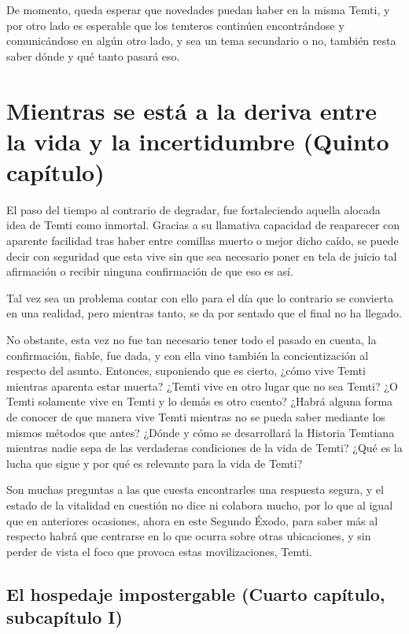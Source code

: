 \documentclass[
  spanish,
]{book}
\begin{document}
De momento, queda esperar que novedades puedan haber en la misma Temti, y por otro lado es esperable que los temteros continúen encontrándose y comunicándose en algún otro lado, y sea un tema secundario o no, también resta saber dónde y qué tanto pasará eso.

\hypertarget{mientras-se-estuxe1-a-la-deriva-entre-la-vida-y-la-incertidumbre-quinto-capuxedtulo}{%
\chapter{Mientras se está a la deriva entre la vida y la incertidumbre (Quinto capítulo)}\label{mientras-se-estuxe1-a-la-deriva-entre-la-vida-y-la-incertidumbre-quinto-capuxedtulo}}

El paso del tiempo al contrario de degradar, fue fortaleciendo aquella alocada idea de Temti como inmortal. Gracias a su llamativa capacidad de reaparecer con aparente facilidad tras haber entre comillas muerto o mejor dicho caído, se puede decir con seguridad que esta vive sin que sea necesario poner en tela de juicio tal afirmación o recibir ninguna confirmación de que eso es así.

Tal vez sea un problema contar con ello para el día que lo contrario se convierta en una realidad, pero mientras tanto, se da por sentado que el final no ha llegado.

No obstante, esta vez no fue tan necesario tener todo el pasado en cuenta, la confirmación, fiable, fue dada, y con ella vino también la concientización al respecto del asunto. Entonces, suponiendo que es cierto, ¿cómo vive Temti mientras aparenta estar muerta? ¿Temti vive en otro lugar que no sea Temti? ¿O Temti solamente vive en Temti y lo demás es otro cuento? ¿Habrá alguna forma de conocer de que manera vive Temti mientras no se pueda saber mediante los mismos métodos que antes? ¿Dónde y cómo se desarrollará la Historia Temtiana mientras nadie sepa de las verdaderas condiciones de la vida de Temti? ¿Qué es la lucha que sigue y por qué es relevante para la vida de Temti?

Son muchas preguntas a las que cuesta encontrarles una respuesta segura, y el estado de la vitalidad en cuestión no dice ni colabora mucho, por lo que al igual que en anteriores ocasiones, ahora en este Segundo Éxodo, para saber más al respecto habrá que centrarse en lo que ocurra sobre otras ubicaciones, y sin perder de vista el foco que provoca estas movilizaciones, Temti.

\hypertarget{el-hospedaje-impostergable-cuarto-capuxedtulo-subcapuxedtulo-i}{%
\section{El hospedaje impostergable (Cuarto capítulo, subcapítulo I)}\label{el-hospedaje-impostergable-cuarto-capuxedtulo-subcapuxedtulo-i}}
\end{document}

